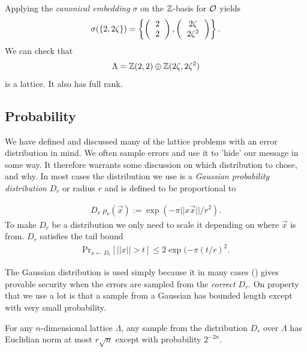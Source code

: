     Applying the \emph{canonical embedding} \(\sigma\) on the \(\mathbb{Z}\)-basis for \(\mathcal{O}\) yields
    \begin{align*}
        \sigma(\{2, 2\zeta\}) = \left\{\left(\begin{tabular}{c} 2\\2 \end{tabular}\right), \left(\begin{tabular}{c} \(2\zeta\)\\\(2\zeta^2\) \end{tabular}\right)\right\}.
    \end{align*}
    We can check that 
    \begin{align*}
        \Lambda = \mathbb{Z}(2, 2)\oplus\mathbb{Z}(2\zeta, 2\zeta^2)
    \end{align*}
    is a lattice. It also has full rank. \par

\subsection{Probability}
    We have defined and discussed many of the lattice problems with an error distribution in mind. We often sample errors and use it to 'hide' our message in some way. It therefore warrants some discussion on which distribution to chose, and why. In most cases  the distribution we use is a \emph{Gaussian probability distribution} \(D_r\) or radius \(r\) and is defined to be proportional to
    
    \begin{align*}
        D_r ~ \rho_r(\vec{x}) := \exp(-\pi ||x\vec{x}||/r^2).
    \end{align*}
    To make \(D_r\) be a distribution we only need to scale it depending on where \(\vec{x}\) is from. \(D_r\) satisfies the tail bound
    \begin{align*}
        \text{Pr}_{x\leftarrow D_r}\left[||x||>t\right] \leq 2\exp(-\pi(t/r)^2.
    \end{align*}
    
    The Gaussian distribution is used simply because it in many cases (\cite{How Not To RLWE}) gives provable security when the errors are sampled from the \emph{correct} \(D_r\). On property that we use a lot is that a sample from a Gaussian has bounded length except with very small probability.
    \begin{proposition}
        \label{Prop: Gaussian Sample Length Propability}
        For any \(n\)-dimensional lattice \(\Lambda\), any sample from the distribution \(D_r\) over \(\Lambda\) has Euclidian norm at most \(r\sqrt{n}\) except with probability \(2^{-2n}\). 
    \end{proposition}
    

